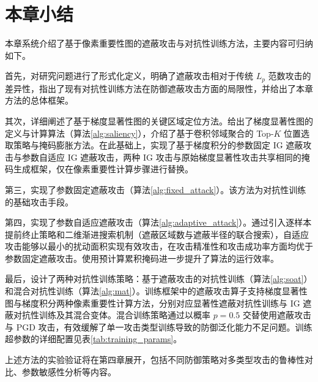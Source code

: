 \section{本章小结}

本章系统介绍了基于像素重要性图的遮蔽攻击与对抗性训练方法，主要内容可归纳如下。

首先，对研究问题进行了形式化定义，明确了遮蔽攻击相对于传统 $L_p$ 范数攻击的差异性，指出了现有对抗性训练方法在防御遮蔽攻击方面的局限性，并给出了本章方法的总体框架。

其次，详细阐述了基于梯度显著性图的关键区域定位方法。给出了梯度显著性图的定义与计算算法（算法\ref{alg:saliency}），介绍了基于卷积邻域聚合的 Top-$K$ 位置选取策略与掩码膨胀方法。在此基础上，实现了基于梯度积分的参数固定 IG 遮蔽攻击与参数自适应 IG 遮蔽攻击，两种 IG 攻击与原始梯度显著性攻击共享相同的掩码生成框架，仅在像素重要性计算步骤进行替换。

第三，实现了参数固定遮蔽攻击（算法\ref{alg:fixed_attack}）。该方法为对抗性训练的基础攻击手段。

第四，实现了参数自适应遮蔽攻击（算法\ref{alg:adaptive_attack}）。通过引入逐样本提前终止策略和二维渐进搜索机制（遮蔽区域数与遮蔽半径的联合搜索），自适应攻击能够以最小的扰动面积实现有效攻击，在攻击精准性和攻击成功率方面均优于参数固定遮蔽攻击。使用预计算累积掩码进一步提升了算法的运行效率。

最后，设计了两种对抗性训练策略：基于遮蔽攻击的对抗性训练（算法\ref{alg:soat}）和混合对抗性训练（算法\ref{alg:mat}）。训练框架中的遮蔽攻击算子支持梯度显著性图与梯度积分两种像素重要性计算方法，分别对应显著性遮蔽对抗性训练与 IG 遮蔽对抗性训练及其混合变体。混合训练策略通过以概率 $p=0.5$ 交替使用遮蔽攻击与 PGD 攻击，有效缓解了单一攻击类型训练导致的防御泛化能力不足问题。训练超参数的详细配置见表\ref{tab:training_params}。

上述方法的实验验证将在第四章展开，包括不同防御策略对多类型攻击的鲁棒性对比、参数敏感性分析等内容。

